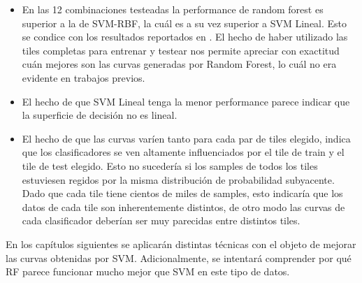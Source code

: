 \begin{itemize}

\item En las 12 combinaciones testeadas la performance de random forest es superior a la de SVM-RBF, la cuál es a su vez superior a SVM Lineal. Esto se condice con los resultados reportados en \cite{jbc}. El hecho de haber utilizado las tiles completas para entrenar y testear nos permite apreciar con exactitud cuán mejores son las curvas generadas por Random Forest, lo cuál no era evidente en trabajos previos.

\item El hecho de que SVM Lineal tenga la menor performance parece indicar que la superficie de decisión no es lineal.
\item El hecho de que las curvas varíen tanto para cada par de tiles elegido, indica que los clasificadores se ven altamente influenciados por el tile de train y el tile de test elegido. Esto no sucedería si los samples de todos los tiles estuviesen regidos por la misma distribución de probabilidad subyacente. Dado que cada tile tiene cientos de miles de samples, esto indicaría que los datos de cada tile son inherentemente distintos, de otro modo las curvas de cada clasificador deberían ser muy parecidas entre distintos tiles.
\end{itemize}

En los capítulos siguientes se aplicarán distintas técnicas con el objeto de mejorar las curvas obtenidas por SVM. Adicionalmente, se intentará comprender por qué RF parece funcionar mucho mejor que SVM en este tipo de datos.